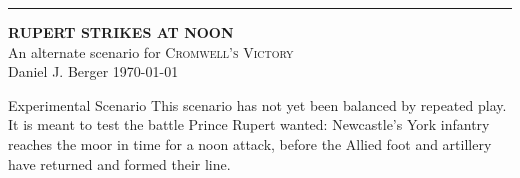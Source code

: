 \documentclass[10pt,letterpaper]{article}
\begin{document}
\begin{center}
  {\color{cvred}\rule{\textwidth}{1.5pt}}\par\vspace{8pt}
  {\sffamily\bfseries\fontsize{29}{32}\selectfont\color{cvblue}
    RUPERT STRIKES AT NOON}\\[2pt]
  {\sffamily\large\color{cvred}An alternate scenario for \textsc{Cromwell's Victory}}\\[4pt]
  {\sffamily\small Daniel J. Berger \textbullet{} \today}
\end{center}

\begin{redBox}{Experimental Scenario}
This scenario has not yet been balanced by repeated play. It is meant to test
the battle Prince Rupert wanted: Newcastle's York infantry reaches the moor in
time for a noon attack, before the Allied foot and artillery have returned and
formed their line.
\end{redBox}




\end{document}
